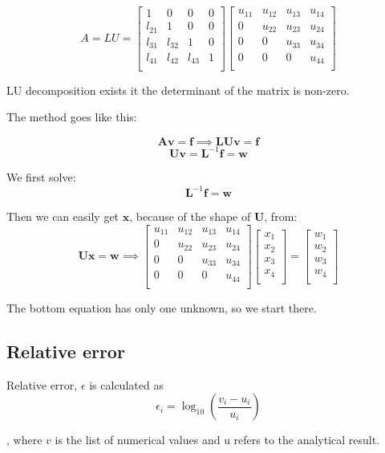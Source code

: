 \[
A = LU = 
    \begin{bmatrix}
    	1& 0& 0 & 0 \\
        l_{21} & 1 & 0 &0\\
        l_{31}&l_{32} & 1 & 0 \\
        l_{41} & l_{42} & l_{43} & 1\\
        \end{bmatrix}
    \begin{bmatrix}
    	u_{11}& u_{12}& u_{13} &u_{14} \\
        0 & u_{22} & u_{23} &u_{24}\\
        0& 0  &u_{33} & u_{34} \\
        0&0 & 0 & u_{44}\\
        \end{bmatrix}
\]

LU decomposition exists it the determinant of the matrix is non-zero.

The method goes like this:

\[
\textbf{A}\textbf{v} = \textbf{f} \implies \textbf{L}\textbf{U}\textbf{v} = \textbf{f}
\]
\[
\textbf{U}\textbf{v} = \textbf{L}^{-1}\textbf{f} = \textbf{w}
\]

We first solve:
\[
\textbf{L}^{-1}\textbf{f} = \textbf{w}
\]

Then we can easily get $\textbf{x}$, because of the shape of $\textbf{U}$, from:
\[
\textbf{Ux}=\textbf{w} \implies 
\begin{bmatrix}
		u_{11}& u_{12}& u_{13} &u_{14} \\
        0 & u_{22} & u_{23} &u_{24}\\
        0& 0  &u_{33} & u_{34} \\
        0&0 & 0 & u_{44}\\
        \end{bmatrix}
\begin{bmatrix}
x_1\\
x_2\\
x_3\\
x_4\\
\end{bmatrix} =
\begin{bmatrix}
w_1\\
w_2\\
w_3\\
w_4\\
\end{bmatrix}        
\]

The bottom equation has only one unknown, so we start there.



\subsection{Relative error}


Relative error, $ \epsilon $ is calculated as
 \begin{equation}
\epsilon_i =  \log_{10}\left( \frac{v_i-u_i}{u_i}\right)
\label{error}
\end{equation} 

, where $ v $ is the list of numerical values and u refers to the analytical result. 